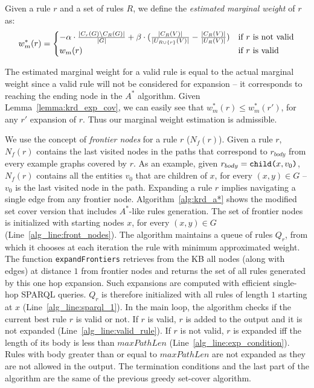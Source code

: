 \begin{definition}\label{def:est_res_wei}
	Given a rule $r$ and a set of rules $R$, we define the \emph{estimated marginal weight} of $r$ as:
	\begin{equation*}
	w_m^*(r) = 
	\begin{cases} - \alpha \cdot \frac{\mid C_{r}(G) \setminus C_{R}(G) \mid}{\mid G \mid} + \beta \cdot (\frac{\mid C_R(V) \mid}{\mid U_{R \cup \{r\}}(V) \mid} - \frac{\mid C_{R}(V) \mid}{\mid U_{R}(V) \mid}) & \mbox{if } r\mbox{ is not valid} \\ w_m(r) & \mbox{if } r\mbox{ is valid} \end{cases}
		\vspace{-2.5ex}
		\end{equation*}
\end{definition}

The estimated marginal weight for a valid rule is equal to the actual marginal weight since a valid rule will not be considered for expansion -- it corresponds to reaching the ending node in the $A^*$ algorithm. Given Lemma~\ref{lemma:krd_exp_cov}, we can easily see that $w_m^*(r) \leq w_m^*(r')$, for any $r'$ expansion of $r$. Thus our marginal weight estimation is admissible.

We use the concept of \emph{frontier nodes} for a rule $r$ ($N_f(r)$). Given a rule $r$, $N_f(r)$ contains the last visited nodes in the paths that correspond to $r_{body}$ from every example graphs covered by $r$. As an example, given $r_{body} = \texttt{child(}x,v_0\texttt{)}$, $N_f(r)$ contains all the entities $v_0$ that are children of $x$, for every $(x,y) \in G$ -- $v_0$ is the last visited node in the path. Expanding a rule $r$ implies navigating a single edge from any frontier node. Algorithm~\ref{alg:krd_a*} shows the modified set cover version that includes $A^*$-like rules generation. The set of frontier nodes is initialized with starting nodes $x$, for every $(x,y) \in G$ (Line~\ref{alg_line:front_nodes}). The algorithm maintains a queue of rules $Q_r$, from which it chooses at each iteration the rule with minimum approximated weight. 
The function \texttt{expandFrontiers} retrieves from the KB all nodes (along with edges) at distance $1$ from frontier nodes and returns the set of all rules generated by this one hop expansion. Such expansions are computed with efficient single-hop SPARQL queries. $Q_r$ is therefore initialized with all rules of length $1$ starting at $x$ (Line~\ref{alg_line:sparql_1}). In the main loop, the algorithm checks if the current best rule $r$ is valid or not. If $r$ is valid, $r$ is added to the output and it is not expanded (Line~\ref{alg_line:valid_rule}). If $r$ is not valid, $r$ is expanded iff the length of its body is less than $maxPathLen$ (Line~\ref{alg_line:exp_condition}). Rules with body greater than or equal to $maxPathLen$ are not expanded as they are not allowed in the output. The termination conditions and the last part of the algorithm are the same of the previous greedy set-cover algorithm. %

